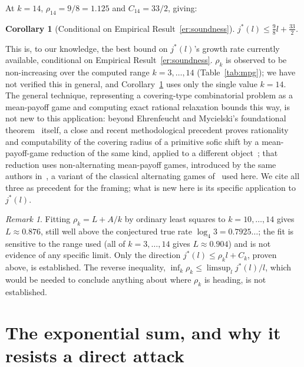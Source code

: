 \documentclass[11pt]{amsart}
\theoremstyle{plain}
\newtheorem{corollary}[theorem]{Corollary}
\theoremstyle{definition}
\theoremstyle{remark}
\newtheorem{remark}[theorem]{Remark}
\begin{document}
At $k=14$, $\rho_{14} = 9/8 = 1.125$ and $C_{14}=33/2$, giving:

\begin{corollary}[Conditional on Empirical Result~\ref{er:soundness}]
\label{cor:mpgbound}
$j^*(l) \le \tfrac98 l + \tfrac{33}2$.
\end{corollary}

This is, to our knowledge, the best bound on $j^*(l)$'s growth rate currently available, conditional
on Empirical Result~\ref{er:soundness}. $\rho_k$ is observed to be non-increasing over the computed
range $k=3,\dots,14$ (Table~\ref{tab:mpg}); we have not verified this in general, and
Corollary~\ref{cor:mpgbound} uses only the single value $k=14$. The general technique, representing a
covering-type combinatorial problem as a mean-payoff game and computing exact rational relaxation
bounds this way, is not new to this application: beyond Ehrenfeucht and Mycielski's foundational
theorem~\cite{ehrenfeuchtmycielski1979} itself, a close and recent methodological precedent proves
rationality and computability of the covering radius of a primitive sofic shift by a mean-payoff-game
reduction of the same kind, applied to a different object~\cite{meyerovitchyoung2026}; that reduction
uses non-alternating mean-payoff games, introduced by the same authors
in~\cite{meyerovitchyoung2025nonalt}, a variant of the classical alternating games
of~\cite{ehrenfeuchtmycielski1979} used here. We cite all three as
precedent for the framing; what is new here is its specific application to $j^*(l)$.

\begin{remark}
Fitting $\rho_k = L + A/k$ by ordinary least squares to $k=10,\dots,14$ gives $L\approx0.876$,
still well above the conjectured true rate $\log_4 3 = 0.7925\ldots$; the fit is sensitive to the
range used (all of $k=3,\dots,14$ gives $L\approx0.904$) and is not evidence of any specific limit.
Only the direction $j^*(l)\le\rho_k l + C_k$, proven above, is established. The reverse inequality,
$\inf_k \rho_k \le \limsup_l j^*(l)/l$, which would be needed to conclude anything about where
$\rho_k$ is heading, is not established.
\end{remark}

\section{The exponential sum, and why it resists a direct attack}
\label{sec:gapA}
\end{document}
